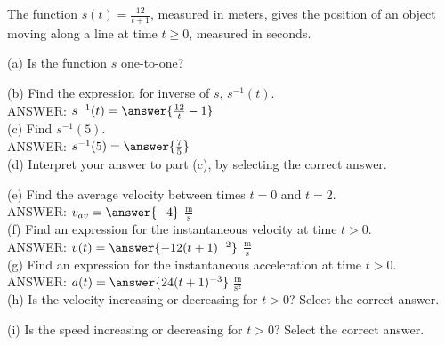 \documentclass{ximera}
\begin{document}
\begin{exercise}
The function $s(t)=\frac{12}{t+1}$, measured in meters, gives the position of an object moving along a line at time $t\geq 0$, measured in seconds.

(a) Is the function $s$ one-to-one? 
\begin{multipleChoice}
\end{multipleChoice}

(b) Find the expression for inverse of $s$, $s^{-1}(t)$.\\

ANSWER: $s^{-1}(t)=\answer{\frac{12}{t}-1}$\\

(c) Find $s^{-1}(5)$.\\

ANSWER: $s^{-1}(5) =\answer{\frac{7}{5}}$\\

(d) Interpret your answer to part (c), by selecting the correct answer.
\begin{multipleChoice}
\end{multipleChoice}

(e) Find the average velocity between times $t=0$ and $t=2$.\\

ANSWER: $v_{av}=\answer{-4}$ $\frac{\text{m}}{\text{s}}$\\

(f) Find an expression for the instantaneous velocity at time $t>0$.\\

ANSWER:  $v(t)=\answer{-12(t+1)^{-2}}$ $\frac{\text{m}}{\text{s}}$\\

(g) Find an expression for the instantaneous acceleration at time $t>0$.\\

ANSWER: $a(t)=\answer{24(t+1)^{-3}}$ $\frac{\text{m}}{\text{s}^2}$\\

(h) Is the velocity increasing or decreasing for $t>0$? Select the correct answer.\\
\begin{multipleChoice}
\end{multipleChoice}

(i) Is the speed increasing or decreasing for $t>0$? Select the correct answer.\\
\begin{multipleChoice}
\end{multipleChoice}
\end{exercise}
\end{document}
